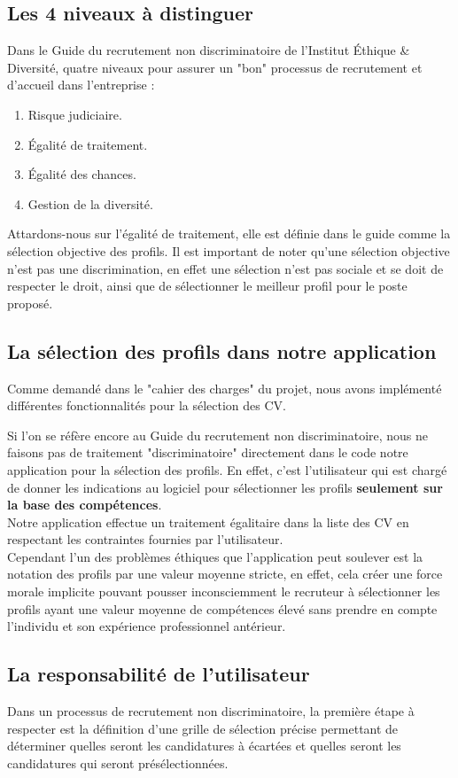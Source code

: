 \documentclass{article}
\begin{document}
\subsection{Les 4 niveaux à distinguer}
Dans le Guide du recrutement non discriminatoire\cite{ied_proc_recrutement}  de l'Institut Éthique & Diversité, quatre niveaux pour assurer un "bon" processus de recrutement et d'accueil dans l'entreprise :
\begin{enumerate}
    \item Risque judiciaire.
    \item Égalité de traitement.
    \item Égalité des chances.
    \item Gestion de la diversité.
\end{enumerate}
Attardons-nous sur l'égalité de traitement, elle est définie dans le guide comme la sélection objective des profils. Il est important de noter qu'une sélection objective n'est pas une discrimination, en effet une sélection n'est pas sociale et se doit de respecter le droit, ainsi que de sélectionner le meilleur profil pour le poste proposé.
\subsection{La sélection des profils dans notre application}
Comme demandé dans le "cahier des charges" du projet, nous avons implémenté différentes fonctionnalités pour la sélection des CV.

Si l'on se réfère encore au Guide du recrutement non discriminatoire\cite{ied_proc_recrutement}, nous ne faisons pas de traitement "discriminatoire" directement dans le code notre application pour la sélection des profils. En effet, c'est l'utilisateur qui est chargé de donner les indications au logiciel pour sélectionner les profils \textbf{seulement sur la base des compétences}. \\
Notre application effectue un traitement égalitaire dans la liste des CV en respectant les contraintes fournies par l'utilisateur.\\
Cependant l'un des problèmes éthiques que l'application peut soulever est la notation des profils par une valeur moyenne stricte, en effet, cela créer une force morale implicite pouvant pousser inconsciemment le recruteur à sélectionner les profils ayant une valeur moyenne de compétences élevé sans prendre en compte l'individu et son expérience professionnel antérieur.
\subsection{La responsabilité de l'utilisateur}
Dans un processus de recrutement non discriminatoire, la première étape à respecter est la définition d'une grille de sélection précise permettant de déterminer quelles seront les candidatures à écartées et quelles seront les candidatures qui seront présélectionnées.
\end{document}
